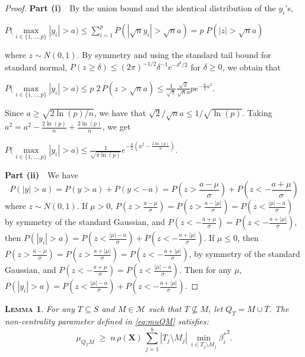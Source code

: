 \documentclass[
  12pt]{article}
\newcommand{\M}{\mathcal{M}}
\newcommand{\bX}{\mathbf{X}}
\newtheorem{lem}[thm]{\textsc{Lemma}}
\begin{document}
\begin{proof} \textbf{Part (i)}  \,\,
By the union bound and the identical distribution of the $y_i$'s,
\begin{center}
    $P\Big(\underset{i\in\{1,\ldots,p\}}{\max}|y_i|> a \Big)     \leq \sum_{i=1}^{p}{ P\left(|\sqrt{n}y_i|>\sqrt{n}a \right)}
    = p\; P\left(|z|>\sqrt{n}a\right)$
\end{center}
    where $z\sim N(0,1)$. 
    By symmetry and using the standard tail bound for standard normal, $P(z \geq \delta) \leq (2\pi)^{-1/2} \delta^{-1} e^{-\delta^{2} / 2}$ for $\delta \geq 0$, we obtain that 
\begin{center}
  $P\Big(\underset{i\in\{1,\ldots,p\}}{\max}|y_i|> a \Big) 
     \leq  p\; 2 \, P\left(z>\sqrt{n}a\right) \leq \frac{1}{\sqrt{\pi}}\frac{\sqrt{2}}{\sqrt{n}a}p e^{-\frac{n}{2} a^{2}}.$
\end{center}
Since $a \geq \sqrt{2\ln(p)/n}$, we have that $\sqrt{2}/\sqrt{n}a\leq 1/\sqrt{\ln(p)}$. Taking $a^2=a^2-\frac{2\ln(p)}{n}+\frac{2\ln(p)}{n}$, we get \begin{center}
$ P\Big(\underset{i\in\{1,\ldots,p\}}{\max}|y_i|> a \Big) \leq \frac{1}{\sqrt{\pi\ln(p)}} e^{-\frac{n}{2} \left(a^{2}-\frac{2\ln(p)}{n}\right)}.$ \\\end{center}

\noindent\textbf{Part (ii)}  \,\, We have
$$P(|y|>a) = P(y>a) + P(y<-a) = P(z>\frac{a-\mu}{\sigma}) + P(z<-\frac{a+\mu}{\sigma})$$
where $z\sim N(0,1)$. If $\mu>0$, $P(z>\frac{a-\mu}{\sigma})  =  P(z>\frac{a-|\mu|}{\sigma})= P(z<\frac{|\mu|-a}{\sigma})$ by symmetry of the standard Gaussian, and $P(z<-\frac{a+\mu}{\sigma})=P(z<-\frac{a+|\mu|}{\sigma})$, then $P(|y_i|>a) =  P(z<\frac{|\mu|-a}{\sigma}) + P(z<-\frac{a+|\mu|}{\sigma})$.
If $\mu\leq0$, then $P(z>\frac{a-\mu}{\sigma})=P(z>\frac{a+|\mu|}{\sigma})=P(z<-\frac{a+|\mu|}{\sigma})$, by symmetry of the standard Gaussian, and $P(z<-\frac{a+\mu}{\sigma})=P(z<\frac{|\mu|-a}{\sigma})$. Then for any $\mu$, $P(|y_i|>a)  = P(z<\frac{|\mu|-a}{\sigma}) + P(z<-\frac{a+|\mu|}{\sigma}) $.
\end{proof}

\begin{lem}\label{lem:boundrhogen}
 For any $T\subseteq S$ and $M\in\M$ such that $T\not\subseteq M$, let $Q_T=M \cup T$. The non-centrality parameter defined in \eqref{eq:muQM} satisfies: 
\begin{equation}
    \mu_{Q_TM}\; \geq \;n\,\rho(\bX)\,\sum_{j=1}^b|T_j\setminus M_j|\,\min_{i\in T_j\setminus M_j}{\beta_{i}^*}^2.
\end{equation}
\end{lem}
\end{document}
